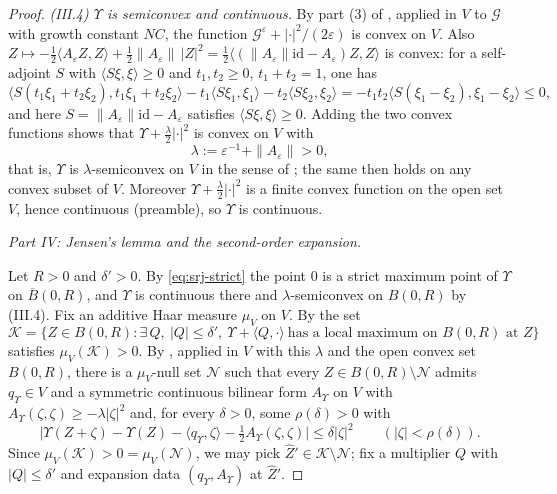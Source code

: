 \begin{proof}
\emph{(III.4) $\Upsilon$ is semiconvex and continuous.}
By part (3) of , applied in $V$ to
$\mathcal G$ with growth constant $NC$, the function
$\mathcal G^\varepsilon+|\cdot|^2/(2\varepsilon)$ is convex on $V$. Also
$Z\mapsto-\tfrac12\langle A_\varepsilon Z,Z\rangle
+\tfrac12\|A_\varepsilon\|\,|Z|^2
=\tfrac12\langle(\|A_\varepsilon\|\mathrm{id}-A_\varepsilon)Z,Z\rangle$ is
convex: for a self-adjoint $S$ with $\langle S\xi,\xi\rangle\ge0$ and
$t_1,t_2\ge0$, $t_1+t_2=1$, one has
\[
  \langle S(t_1\xi_1+t_2\xi_2),t_1\xi_1+t_2\xi_2\rangle
   -t_1\langle S\xi_1,\xi_1\rangle-t_2\langle S\xi_2,\xi_2\rangle
   =-t_1t_2\langle S(\xi_1-\xi_2),\xi_1-\xi_2\rangle\le0,
\]
and here $S=\|A_\varepsilon\|\mathrm{id}-A_\varepsilon$ satisfies
$\langle S\xi,\xi\rangle\ge0$. Adding the two convex functions shows that
$\Upsilon+\tfrac{\lambda}{2}|\cdot|^2$ is convex on $V$ with
\[
  \lambda:=\varepsilon^{-1}+\|A_\varepsilon\|>0,
\]
that is, $\Upsilon$ is $\lambda$-semiconvex on $V$ in the sense of
; the same then holds on any convex subset of $V$.
Moreover $\Upsilon+\tfrac\lambda2|\cdot|^2$ is a finite convex function on the
open set $V$, hence continuous (preamble), so $\Upsilon$ is continuous.

\medskip\noindent\emph{Part IV: Jensen's lemma and the second-order expansion.}

Let $R>0$ and $\delta'>0$. By \eqref{eq:srj-strict} the point $0$ is a strict
maximum point of $\Upsilon$ on $\overline B(0,R)$, and $\Upsilon$ is continuous
there and $\lambda$-semiconvex on $B(0,R)$ by (III.4). Fix an additive Haar
measure $\mu_V$ on $V$. By  the set
\[
  \mathcal K=\bigl\{Z\in B(0,R):\exists\,Q,\ |Q|\le\delta',\
    \Upsilon+\langle Q,\cdot\rangle\ \text{has a local maximum on }B(0,R)
    \text{ at }Z\bigr\}
\]
satisfies $\mu_V(\mathcal K)>0$. By , applied
in $V$ with this $\lambda$ and the open convex set $B(0,R)$, there is a
$\mu_V$-null set $\mathcal N$ such that every $Z\in B(0,R)\setminus\mathcal N$
admits $q_\Upsilon\in V$ and a symmetric continuous bilinear form $A_\Upsilon$ on
$V$ with $A_\Upsilon(\zeta,\zeta)\ge-\lambda|\zeta|^2$ and, for every
$\delta>0$, some $\rho(\delta)>0$ with
\begin{equation}\label{eq:srj-expansion}
  \bigl|\Upsilon(Z+\zeta)-\Upsilon(Z)-\langle q_\Upsilon,\zeta\rangle
    -\tfrac12A_\Upsilon(\zeta,\zeta)\bigr|\le\delta|\zeta|^2
  \qquad(|\zeta|<\rho(\delta)).
\end{equation}
Since $\mu_V(\mathcal K)>0=\mu_V(\mathcal N)$, we may pick
$\widehat Z'\in\mathcal K\setminus\mathcal N$; fix a multiplier $Q$ with
$|Q|\le\delta'$ and expansion data $(q_\Upsilon,A_\Upsilon)$ at
$\widehat Z'$.


\end{proof}
